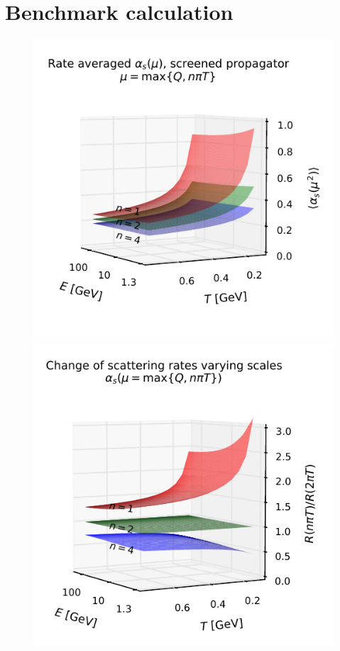 \documentclass[aps, prc, reprint, amsmath, groupedaddress, nofootinbib]{revtex4-1}
\begin{document}
\section{Benchmark calculation}
\begin{figure}
\includegraphics[width=\columnwidth]{charm-plot/avg_alphas.pdf}\\
\includegraphics[width=\columnwidth]{charm-plot/Rscale.pdf}
\end{figure}
\end{document}
